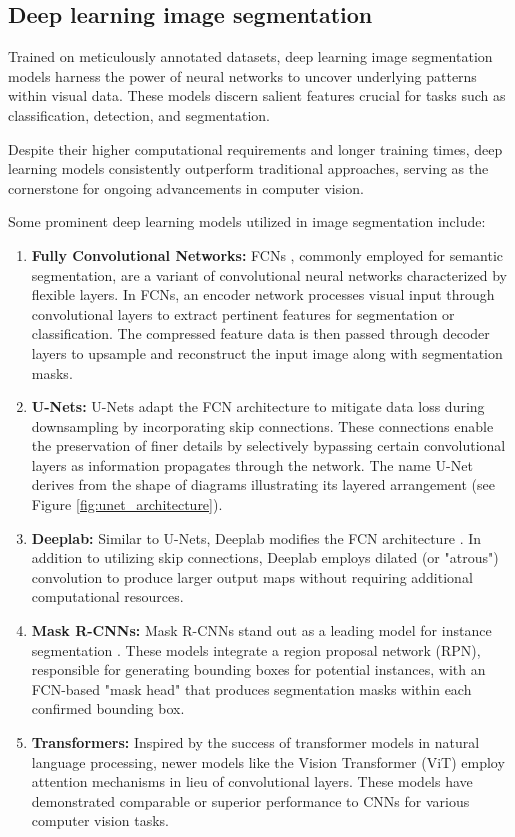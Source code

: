 \subsection{Deep learning image segmentation}
Trained on meticulously annotated datasets, deep learning image segmentation models harness the power of neural networks to uncover underlying patterns within visual data. These models discern salient features crucial for tasks such as classification, detection, and segmentation.

Despite their higher computational requirements and longer training times, deep learning models consistently outperform traditional approaches, serving as the cornerstone for ongoing advancements in computer vision.

Some prominent deep learning models utilized in image segmentation include:

\begin{enumerate}
  \item \textbf{Fully Convolutional Networks:} FCNs \cite{FCNLong2015}, commonly employed for semantic segmentation, are a
  variant
  of
  convolutional neural networks characterized by flexible layers. In FCNs, an encoder network processes visual input through convolutional layers to extract pertinent features for segmentation or classification. The compressed feature data is then passed through decoder layers to upsample and reconstruct the input image along with segmentation masks.
  \item \textbf{U-Nets:} U-Nets \cite{ronneberger2015unet} adapt the FCN architecture to mitigate data loss during downsampling by
  incorporating skip connections. These connections enable the preservation of finer details by selectively bypassing
  certain convolutional layers as information propagates through the network. The name U-Net derives from the shape 
  of diagrams illustrating its layered arrangement (see Figure \ref{fig:unet_architecture}).
  \item \textbf{Deeplab:} Similar to U-Nets, Deeplab modifies the FCN architecture \cite{Deeplab2018}. In addition to utilizing skip
  connections, Deeplab employs dilated (or "atrous") convolution to produce larger output maps without requiring additional computational resources.
  \item \textbf{Mask R-CNNs:} Mask R-CNNs stand out as a leading model for instance segmentation \cite{MaskRCNN2017}. These models
  integrate a region proposal network (RPN), responsible for generating bounding boxes for potential instances, with an FCN-based "mask head" that produces segmentation masks within each confirmed bounding box.
  \item \textbf{Transformers:} Inspired by the success of transformer models \cite{vaswani2023attention} in natural language processing,
  newer models like the Vision Transformer (ViT) employ attention mechanisms in lieu of convolutional layers. These models have demonstrated comparable or superior performance to CNNs for various computer vision tasks.
\end{enumerate}

